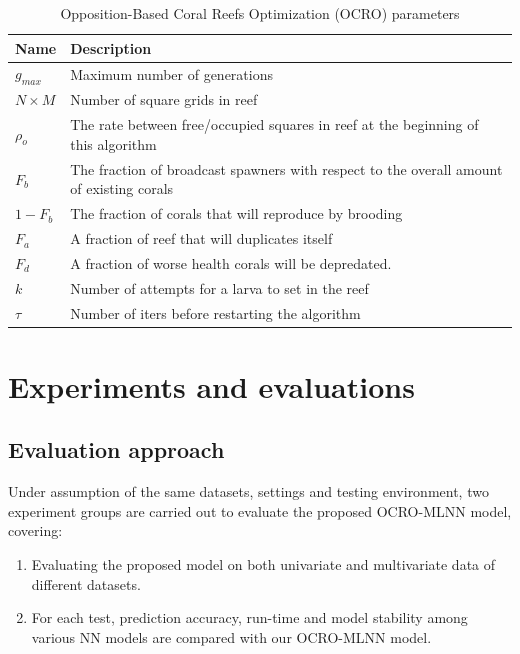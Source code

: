 \documentclass[smallcondensed, natbib]{svjour3}     %
\begin{document}
\begin{table}[!h]
\begin{center}
\begin{tabular}{ C{1.5cm}| L{14cm}  } 
\textbf{Name} & \textbf{Description} \\ 		\hline
$g_{max}$ & Maximum number of generations \\ 	%
$N \times M$ & Number of square grids in reef \\ 		%
$\rho_{o}$ & The rate between free/occupied squares in reef at the beginning of this algorithm \\ 		%
$F_{b}$ & The fraction of broadcast spawners with respect to the overall amount of existing corals \\ 	%
$1 - F_{b}$ & The fraction of corals that will reproduce by brooding \\ 	%
$F_{a}$ & A fraction of reef that will duplicates itself \\ 				%
$F_{d}$ & A fraction of worse health corals will be depredated.  \\ 		%
$k$ & Number of attempts for a larva to set in the reef \\ 				%
$\tau$ & Number of iters before restarting the algorithm \\ 					%
\end{tabular}
\end{center}
\caption{Opposition-Based Coral Reefs Optimization (OCRO) parameters}
\label{table:ocro_paras}
\end{table}

\section{Experiments and evaluations}
\label{experiments}

\subsection{Evaluation approach}
Under assumption of the same datasets, settings and testing environment, two experiment groups are carried out to evaluate the proposed OCRO-MLNN model, covering:

\begin{enumerate}
	\item Evaluating the proposed model on both univariate and multivariate data of different datasets.
	\item For each test, prediction accuracy, run-time and model stability among various NN models are compared with our OCRO-MLNN model. 
\end{enumerate}
\end{document}
